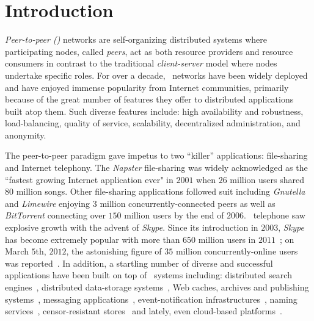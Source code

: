 \section{Introduction}
\label{section:intro}

\emph{Peer-to-peer (\p)} networks are self-organizing distributed systems where
participating nodes, called \emph{peers}, act as both resource providers and
resource consumers in contrast to the traditional \emph{client-server} model
where nodes undertake specific roles.
For over a decade, \p\ networks have been widely deployed and have
enjoyed immense popularity from Internet communities, primarily because
of the great number of features they offer to distributed applications 
built atop them. 
Such diverse features include:  high availability and robustness,
load-balancing, quality of service, scalability, decentralized administration,
and anonymity. 

The peer-to-peer paradigm gave impetus to two ``killer'' applications:
file-sharing and Internet telephony.
The {\sl Napster} file-sharing was widely acknowledged as the 
``fastest growing Internet application ever" in $2001$ when 
$26$ million users shared $80$ million songs.
Other file-sharing applications followed suit 
including {\sl Gnutella} and {\sl Limewire} enjoying $3$ 
million concurrently-connected peers as well as 
{\sl BitTorrent} connecting over $150$ million users by the end of $2006$.
\p\ telephone saw explosive growth with the advent of {\sl Skype}. 
Since its introduction in $2003$,
{\sl Skype} has become extremely popular with more than $650$ million users 
in $2011$~\cite{skypetotalusers}; on March $5$th, $2012$,  
the astonishing figure of $35$ million concurrently-online users  
was reported~\cite{skypesymusers}.
In addition, a startling number of diverse and successful
applications have been built on top of \p\ systems including:
distributed search engines~\cite{yaci}, 
distributed data-storage systems~\cite{kbc_oceanstore_2000,bdet_fsdfs_2000,dkkms_cfs_2001,dr_pastutility_2001,abc_farsite_2002,mmfc_ivy_2002,arla,agebh_dks_2003},
Web caches, archives and publishing systems~\cite{ird_squirrel_2002,bags_youserv_2002,wrc_publius_2000,wm_tangler_2001},
messaging applications~\cite{threedegrees}, 
event-notification infrastructures~\cite{rkcd_scribe_2001,cdkr_scribe_2002,agebh_dks_2003}, 
naming services~\cite{cmm_chorddns_2002}, 
censor-resistant stores~\cite{cswh_freenet_2001} and
lately, even cloud-based platforms~\cite{mgpj_cloudsnap_2011}.

